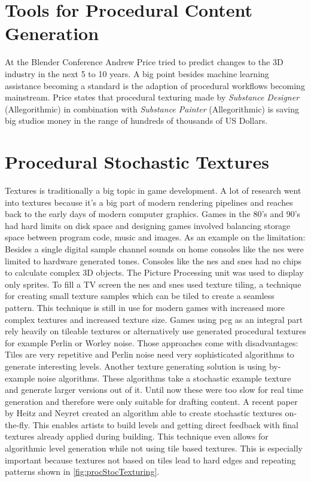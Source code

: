 \documentclass[10pt,a4paper]{article}
\begin{document}
\section{Tools for Procedural Content Generation}
\begin{multicols}{2}
At the Blender Conference Andrew Price tried to predict changes to the 3D industry in the next 5 to 10 years. A big point besides machine learning assistance becoming a standard is the adaption of procedural workflows becoming mainstream\cite{Price2018}. Price states that procedural texturing made by \textit{Substance Designer} (Allegorithmic) in combination with \textit{Substance Painter} (Allegorithmic) is saving big studios money in the range of hundreds of thousands of US Dollars.
\end{multicols}
\section{Procedural Stochastic Textures}
\begin{multicols}{2}
Textures is traditionally a big topic in game development. A lot of research went into textures because it’s a big part of modern rendering pipelines and reaches back to the early days of modern computer graphics. Games in the 80’s and 90’s had hard limits on disk space\cite{Ferrari2016} and designing games involved balancing storage space between program code, music and images. As an example on the limitation: Besides a single digital sample channel sounds on home consoles like the \gls{nes} were limited to hardware generated tones\cite{wiki:NintendoEntertainmentSystem}. Consoles like the \gls{nes} and \gls{snes} had no chips to calculate complex 3D objects. The Picture Processing unit was used to display only sprites. To fill a TV screen the \gls{nes} and \gls{snes} used texture tiling, a technique for creating small texture samples which can be tiled to create a seamless pattern. This technique is still in use for modern games with increased more complex textures and increased texture size. Games using \gls{pcg} as an integral part rely heavily on tileable textures or alternatively use generated procedural textures for example Perlin\cite{perlin1985image} or Worley\cite{worley1996cellular} noise. Those approaches come with disadvantages: Tiles are very repetitive and Perlin noise need very sophisticated algorithms to generate interesting levels. Another texture generating solution is using by-example noise algorithms. These algorithms take a stochastic example texture and generate larger versions out of it. Until now these were too slow for real time generation and therefore were only suitable for drafting content. A recent paper by Heitz and Neyret created an algorithm able to create stochastic textures on-the-fly\cite{Heitz2018}. This enables artists to build levels and getting direct feedback with final textures already applied during building. This technique even allows for algorithmic level generation while not using tile based textures. This is especially important because textures not based on tiles lead to hard edges and repeating patterns shown in \autoref{fig:procStocTexturing}.
\end{multicols}
\end{document}
